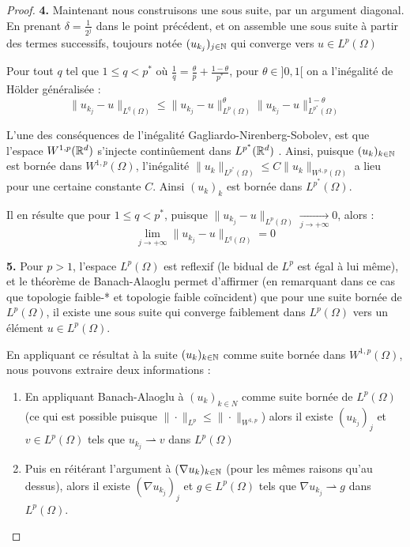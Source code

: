 \begin{proof}
    \vspace{1em}

    \textbf{4.}
    Maintenant nous construisons une sous suite, par un argument diagonal. En prenant $\delta = \frac{1}{2^j}$ dans le point précédent, et on assemble une sous suite à partir des termes successifs, toujours notée $(u_{k_j})_{j \in \mathbb{N}}$ qui converge vers $u \in L^p(\Omega)$

    Pour tout $q$ tel que $1 \leq q < p^*$ où $\frac{1}{q} = \frac{\theta}{p} + \frac{1 - \theta}{p^*}$, pour $\theta \in ]0,1[$ on a l'inégalité de Hölder généralisée :
    $$\|u_{k_j} - u\|_{L^q(\Omega)} \leq \|u_{k_j} - u\|_{L^p(\Omega)}^{\theta} \|u_{k_j} - u\|_{L^{p^*}(\Omega)}^{1 - \theta} $$

    L'une des conséquences de l'inégalité Gagliardo-Nirenberg-Sobolev, est que l'espace $W^{1,p}(\mathbb{R}^d)$ s'injecte continûement dans $L^{p^*}(\mathbb{R}^d)$ \cite{Evans}.
    Ainsi, puisque $(u_k)_{k \in \mathbb{N}}$ est bornée dans $W^{1,p}(\Omega)$, l'inégalité $\| u_k \|_{L^{p^*}(\Omega)} \leq C \| u_k \|_{W^{1,p}(\Omega)} $ a lieu pour une certaine constante $C$. Ainsi $(u_k)_k$ est bornée dans $L^{p^*}(\Omega)$. 
    
    Il en résulte que pour $1 \leq q < p^* $, puisque $\|u_{k_j} - u \|_{L^p(\Omega)} \xrightarrow[j \to +\infty]{} 0$, alors :
    $$\underset{j \to +\infty}{\lim} \| u_{k_j} - u \|_{L^q(\Omega)} = 0 $$


    \vspace{1em}

    \textbf{5.}
    Pour $p>1$, l'espace $L^p(\Omega)$ est reflexif (le bidual de $L^p$ est égal à lui même), et le théorème de Banach-Alaoglu permet d'affirmer (en remarquant dans ce cas que topologie faible-* et topologie faible coïncident)
    que pour une suite bornée de $L^p(\Omega)$, il existe une sous suite qui converge faiblement dans $L^p(\Omega)$ vers un élément $u \in L^p(\Omega)$.
    
    En appliquant ce résultat à la suite $(u_k)_{k \in \mathbb{N}}$ comme suite bornée dans $W^{1,p}(\Omega)$, nous pouvons extraire deux informations :
    \begin{enumerate}
        \item En appliquant Banach-Alaoglu à $(u_k)_{k\in N}$ comme suite bornée de $L^p(\Omega)$ (ce qui est possible puisque $\|\cdot\|_{L^p} \leq \|\cdot\|_{W^{1,p}}$) alors il existe $(u_{k_j})_j$ et $v \in L^p(\Omega)$ tels que $u_{k_j} \rightharpoonup v$ dans $L^p(\Omega)$
        \item Puis en réitérant l'argument à $(\nabla u_k)_{k \in \mathbb{N}}$ (pour les mêmes raisons qu'au dessus), alors il existe $(\nabla u_{k_j})_j$ et $g\in L^p(\Omega)$ tels que $\nabla u_{k_j} \rightharpoonup g$ dans $L^p(\Omega)$.
    \end{enumerate}


\end{proof}
